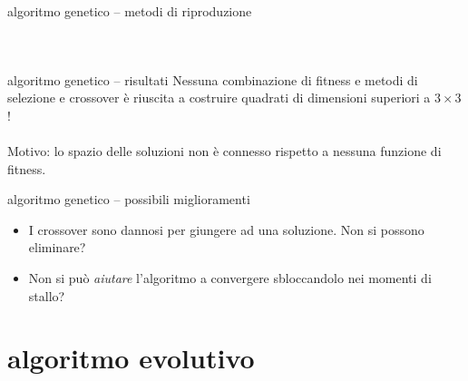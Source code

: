 \documentclass[10pt]{beamer}
\begin{document}
\begin{frame}{algoritmo genetico -- metodi di riproduzione}
\begin{columns}[T,onlytextwidth]
\begin{figure}[!htbp]
{
            }\quad
           \end{figure}
	\end{columns}
\end{frame}

\begin{frame}{algoritmo genetico -- risultati}
			\alert{Nessuna} combinazione di fitness e metodi di selezione e crossover è riuscita a costruire quadrati di dimensioni superiori a $ 3\times3 $!
			\\ \hfill \\
			Motivo: lo spazio delle soluzioni non è \alert{connesso} rispetto a nessuna funzione di fitness.
\end{frame}

\begin{frame}{algoritmo genetico -- possibili miglioramenti}
	\begin{itemize}
		\item I crossover sono dannosi per giungere ad una soluzione. Non si possono eliminare?
		\item Non si può \emph{aiutare} l'algoritmo a convergere sbloccandolo nei momenti di stallo?
	\end{itemize}
\end{frame}

\section{algoritmo evolutivo}
\end{document}

